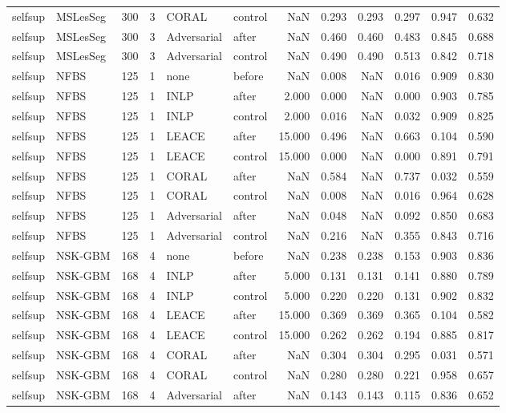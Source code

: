 \begin{tabular}{llrrllrrrrrr}
selfsup & MSLesSeg & 300 & 3 & CORAL & control & NaN & 0.293 & 0.293 & 0.297 & 0.947 & 0.632 \\
selfsup & MSLesSeg & 300 & 3 & Adversarial & after & NaN & 0.460 & 0.460 & 0.483 & 0.845 & 0.688 \\
selfsup & MSLesSeg & 300 & 3 & Adversarial & control & NaN & 0.490 & 0.490 & 0.513 & 0.842 & 0.718 \\
selfsup & NFBS & 125 & 1 & none & before & NaN & 0.008 & NaN & 0.016 & 0.909 & 0.830 \\
selfsup & NFBS & 125 & 1 & INLP & after & 2.000 & 0.000 & NaN & 0.000 & 0.903 & 0.785 \\
selfsup & NFBS & 125 & 1 & INLP & control & 2.000 & 0.016 & NaN & 0.032 & 0.909 & 0.825 \\
selfsup & NFBS & 125 & 1 & LEACE & after & 15.000 & 0.496 & NaN & 0.663 & 0.104 & 0.590 \\
selfsup & NFBS & 125 & 1 & LEACE & control & 15.000 & 0.000 & NaN & 0.000 & 0.891 & 0.791 \\
selfsup & NFBS & 125 & 1 & CORAL & after & NaN & 0.584 & NaN & 0.737 & 0.032 & 0.559 \\
selfsup & NFBS & 125 & 1 & CORAL & control & NaN & 0.008 & NaN & 0.016 & 0.964 & 0.628 \\
selfsup & NFBS & 125 & 1 & Adversarial & after & NaN & 0.048 & NaN & 0.092 & 0.850 & 0.683 \\
selfsup & NFBS & 125 & 1 & Adversarial & control & NaN & 0.216 & NaN & 0.355 & 0.843 & 0.716 \\
selfsup & NSK-GBM & 168 & 4 & none & before & NaN & 0.238 & 0.238 & 0.153 & 0.903 & 0.836 \\
selfsup & NSK-GBM & 168 & 4 & INLP & after & 5.000 & 0.131 & 0.131 & 0.141 & 0.880 & 0.789 \\
selfsup & NSK-GBM & 168 & 4 & INLP & control & 5.000 & 0.220 & 0.220 & 0.131 & 0.902 & 0.832 \\
selfsup & NSK-GBM & 168 & 4 & LEACE & after & 15.000 & 0.369 & 0.369 & 0.365 & 0.104 & 0.582 \\
selfsup & NSK-GBM & 168 & 4 & LEACE & control & 15.000 & 0.262 & 0.262 & 0.194 & 0.885 & 0.817 \\
selfsup & NSK-GBM & 168 & 4 & CORAL & after & NaN & 0.304 & 0.304 & 0.295 & 0.031 & 0.571 \\
selfsup & NSK-GBM & 168 & 4 & CORAL & control & NaN & 0.280 & 0.280 & 0.221 & 0.958 & 0.657 \\
selfsup & NSK-GBM & 168 & 4 & Adversarial & after & NaN & 0.143 & 0.143 & 0.115 & 0.836 & 0.652 \\

\end{tabular}
